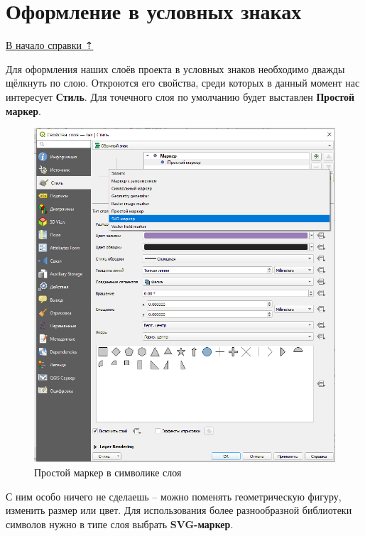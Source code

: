 \documentclass[
  12pt,
]{book}
\begin{document}
\section{Оформление в условных знаках}\label{symbols-symbols}

\hyperref[symbols]{В начало справки ⇡}

Для оформления наших слоёв проекта в условных знаков необходимо дважды щёлкнуть по слою. Откроются его свойства, среди которых в данный момент нас интересует \textbf{Стиль}. Для точечного слоя по умолчанию будет выставлен \textbf{Простой маркер}.

\begin{figure}
\centering
\includegraphics{images/symbology/Symbol_style_svg.png}
\caption{Простой маркер в символике слоя}
\end{figure}

С ним особо ничего не сделаешь -- можно поменять геометрическую фигуру, изменить размер или цвет. Для использования более разнообразной библиотеки символов нужно в типе слоя выбрать \textbf{SVG-маркер}.
\end{document}
